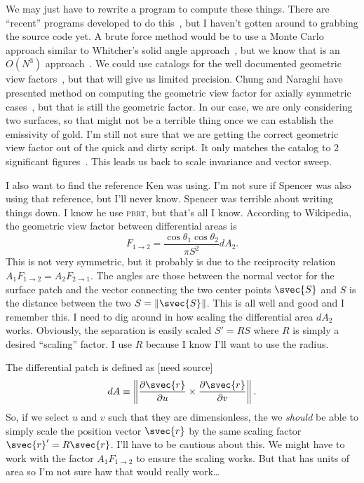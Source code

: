 We may just have to rewrite a program to compute these things.  There
are ``recent'' programs developed to do
this~\cite{walton_calculation_2002}, but I haven't gotten around to
grabbing the source code yet.  A brute force method would be to use a
Monte Carlo approach similar to Whitcher's solid angle
approach~\cite{whitcher_monte_2012}, but we know that is an \(O(N^3)\)
approach~\cite{walton_calculation_2002}.  We could use catalogs for the
well documented geometric view factors~\cite{howell_catalog_2010}, but
that will give us limited precision.  Chung and Naraghi have presented
method on computing the geometric view factor for axially symmetric
cases~\cite{chung_simpler_1982, naraghi_radiation_1982,
chung_formulation_1984}, but that is still the geometric factor.  In our
case, we are only considering two surfaces, so that might not be a
terrible thing once we can establish the emissivity of gold.  I'm still
not sure that we are getting the correct geometric view factor out of
the quick and dirty script.  It only matches the catalog to 2
significant figures~\cite{howell_catalog_2010}.  This leads us back to
scale invariance and vector sweep.

I also want to find the reference Ken was using.  I'm not sure if
Spencer was also using that reference, but I'll never know.  Spencer was
terrible about writing things down.  I know he use \textsc{pbrt}, but
that's all I know.  According to Wikipedia, the geometric view factor
between differential areas is
\begin{equation}
    F_{1\to2} = \frac{\cos\theta_1\cos\theta_2}{\pi S^2} dA_2.
\end{equation}
This is not very symmetric, but it probably is due to the reciprocity
relation \(A_1F_{1\to2} = A_2F_{2\to1}\).  The angles are those between
the normal vector for the surface patch and the vector connecting the
two center points \(\svec{S}\) and \(S\) is the distance between the two
\(S = \lVert\svec{S}\rVert\).  This is all well and good and I remember
this.  I need to dig around in how scaling the differential area
\(dA_2\) works.  Obviously, the separation is easily scaled \(S' = R S\)
where \(R\) is simply a desired ``scaling'' factor.  I use \(R\) because
I know I'll want to use the radius.

The differential patch is defined as [need source]
\begin{equation}
    dA \equiv \left\lVert \frac{\partial\svec{r}}{\partial u} \times
    \frac{\partial\svec{r}}{\partial v} \right \rVert.
\end{equation}
So, if we select \(u\) and \(v\) such that they are dimensionless, the
we \emph{should} be able to simply scale the position vector
\(\svec{r}\) by the same scaling factor \(\svec{r}' = R \svec{r}\).
I'll have to be cautious about this.  We might have to work with the
factor \(A_1F_{1\to2}\) to ensure the scaling works.  But that has units
of area so I'm not sure haw that would really work\ldots


